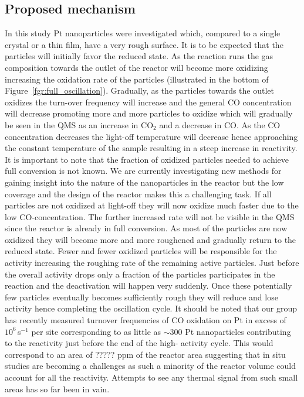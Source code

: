 \documentclass[journal=jacsat,manuscript=article]{achemso}
\begin{document}
\subsection{Proposed mechanism}
In this study Pt nanoparticles were investigated which, compared to a single
crystal or a thin film, have a very rough surface. It is to be expected that the
particles will initially favor the reduced state. As the reaction runs the gas
composition towards the outlet of the reactor will become more oxidizing
increasing the oxidation rate of the particles (illustrated in the bottom of
Figure~\ref{fgr:full_oscillation}). Gradually, as the particles towards the outlet
oxidizes the turn-over frequency will increase and the general CO concentration will
decrease promoting more and more particles to oxidize which will gradually be
seen in the QMS as an increase in CO$_2$ and a decrease in CO. As the CO
concentration decreases the light-off temperature will decrease hence
approaching the constant temperature of the sample resulting in a steep
increase in reactivity. It is important to note that the fraction of oxidized
particles needed to achieve full conversion is not known. We are currently
investigating new methods for gaining insight into the nature of the
nanoparticles in the reactor but the low coverage and the design of the reactor
makes this a challenging task. If all particles are not oxidized at light-off
they will now oxidize much faster due to the low CO-concentration. The further
increased rate will not be visible in the QMS since the reactor is already in
full conversion. As most of the particles are now oxidized they will become
more and more roughened and gradually return to the reduced state. Fewer and
fewer oxidized particles will be responsible for the activity increasing the
roughing rate of the remaining active particles. Just before the overall
activity drops only a fraction of the particles participates in the reaction
and the deactivation will happen very suddenly. Once these potentially few
particles eventually becomes sufficiently rough they will reduce and lose
activity hence completing the oscillation cycle. It should be noted that our
group has recently measured turnover frequencies of CO oxidation on Pt in
excess of $10^{6}$\,s$^{-1}$ per site corresponding to as little as $\sim$300 Pt
nanoparticles contributing to the reactivity just before the end of the high-
activity cycle. This would correspond to an area of ????? ppm of the reactor
area suggesting that in situ studies are becoming a challenges as such a
minority of the reactor volume could account for all the reactivity. Attempts
to see any thermal signal from such small areas has so far been in vain.
\end{document}
